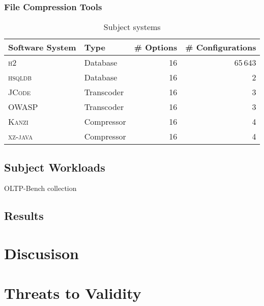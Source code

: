 \documentclass[conference]{IEEEtran}
\begin{document}
\subsubsection{File Compression Tools}

\begin{table}
	\centering
	\caption{Subject systems}
	\begin{tabular}{llrr}
		\toprule
		\textbf{Software System} & \textbf{Type} & \textbf{\# Options} & \textbf{\# Configurations} \\
		\midrule
		\textsc{h2} & Database & 16 & 65\,643\\
		\textsc{hsqldb} & Database & 16 & 2\\
		\midrule
		\textsc{JCode} & Transcoder & 16 & 3\\
		\textsc{OWASP} & Transcoder & 16 & 3\\
		\midrule
		\textsc{Kanzi} & Compressor & 16 & 4\\
		\textsc{xz-java} & Compressor & 16 & 4\\
		\bottomrule
	\end{tabular}
	\label{tab:subject_systems}
	
\end{table}

\subsection{Subject Workloads}
OLTP-Bench collection~\cite{difallah_oltp_2013}
	
\subsection{Results}


\section{Discusison}
\section{Threats to Validity}
\end{document}
